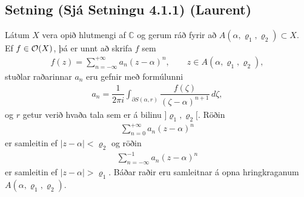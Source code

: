 \documentclass[a4paper,10pt,icelandic]{sphinxmanual}
\begin{document}
\subsection{Setning  (Sjá Setningu 4.1.1) (Laurent)}
\label{\detokenize{Kafli04:setning-sja-setningu-4-1-1-laurent}}
Látum \(X\) vera opið hlutmengi af \({\mathbb{C}}\) og gerum ráð fyrir að \(A(\alpha,\varrho_1,\varrho_2)\subset X\). Ef \(f\in {\cal O}(X)\), þá er unnt að skrifa \(f\) sem
\begin{equation*}
\begin{split}f(z)=\sum_{n=-\infty}^{+\infty}a_n(z-\alpha)^ n, \qquad z\in
A(\alpha,\varrho_1,\varrho_2),\end{split}
\end{equation*}
stuðlar raðarinnar \(a_n\) eru gefnir með formúlunni
\begin{equation*}
\begin{split}a_n=\dfrac 1{2\pi i}\int_{\partial S(\alpha,r)} \dfrac{f(\zeta)}
{(\zeta-\alpha)^{n+1}} \, d\zeta,\end{split}
\end{equation*}
og \(r\) getur verið hvaða tala sem er á bilinu
\(]\varrho_1,\varrho_2[\). Röðin
\begin{equation*}
\begin{split}\sum_{n=0}^{+\infty}a_n(z-\alpha)^ n\end{split}
\end{equation*}
er samleitin ef \(|z-\alpha|<\varrho_2\) og röðin
\begin{equation*}
\begin{split}\sum_{n=-\infty}^{-1}a_n(z-\alpha)^ n\end{split}
\end{equation*}
er samleitin ef \(|z-\alpha|>\varrho_1\). Báðar raðir eru
samleitnar á opna hringkraganum \(A(\alpha,\varrho_1, \varrho_2)\).
\end{document}
